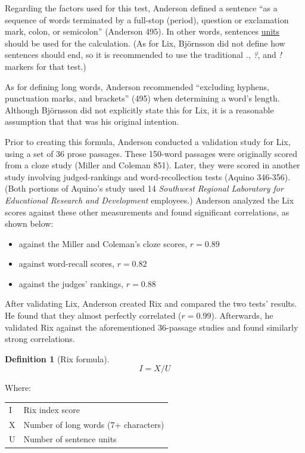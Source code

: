 \documentclass[
]{book}
\providecommand{\tightlist}{%
  \setlength{\itemsep}{0pt}\setlength{\parskip}{0pt}}
\theoremstyle{definition}
\newtheorem{definition}{Definition}[chapter]
\theoremstyle{definition}
\theoremstyle{definition}
\theoremstyle{definition}
\theoremstyle{remark}
\begin{document}
Regarding the factors used for this test, Anderson defined a sentence ``as a sequence of words terminated by a full-stop (period), question or exclamation mark, colon, or semicolon'' (Anderson 495). In other words, sentences \protect\hyperlink{glossary}{units} should be used for the calculation. (As for Lix, Björnsson did not define how sentences should end, so it is recommended to use the traditional \emph{.}, \emph{?}, and \emph{!} markers for that test.)

As for defining long words, Anderson recommended ``excluding hyphens, punctuation marks, and brackets'' (495) when determining a word's length. Although Björnsson did not explicitly state this for Lix, it is a reasonable assumption that that was his original intention.

Prior to creating this formula, Anderson conducted a validation study for Lix, using a set of 36 prose passages. These 150-word passages were originally scored from a cloze study (Miller and Coleman 851). Later, they were scored in another study involving judged-rankings and word-recollection tests (Aquino 346-356). (Both portions of Aquino's study used 14 \emph{Southwest Regional Laboratory for Educational Research and Development} employees.) Anderson analyzed the Lix scores against these other measurements and found significant correlations, as shown below:

\begin{itemize}
\tightlist
\item
  against the Miller and Coleman's cloze scores, \(r = 0.89\)
\item
  against word-recall scores, \(r = 0.82\)
\item
  against the judges' rankings, \(r = 0.88\)
\end{itemize}

After validating Lix, Anderson created Rix and compared the two tests' results. He found that they almost perfectly correlated (\(r = 0.99\)). Afterwards, he validated Rix against the aforementioned 36-passage studies and found similarly strong correlations.

\newpage

\begin{definition}[Rix formula]
\protect\hypertarget{def:rix}{}{\label{def:rix} {} }\[
I = X/U
\]
\end{definition}

Where:

\begin{longtable}[]{@{}
  >{\raggedright\arraybackslash}p{}
  >{\raggedright\arraybackslash}p{}@{}}
\toprule
\endhead
I & Rix index score \\
X & Number of long words (7+ characters) \\
U & Number of sentence units \\
\bottomrule
\end{longtable}
\end{document}
